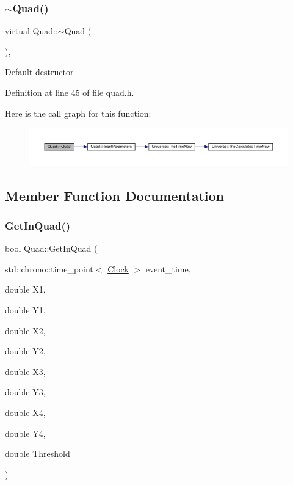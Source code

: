 \subsubsection{\texorpdfstring{$\sim$\+Quad()}{~Quad()}}
{\footnotesize\ttfamily virtual Quad\+::$\sim$\+Quad (\begin{DoxyParamCaption}{ }\end{DoxyParamCaption})\hspace{0.3cm}{\ttfamily [inline]}, {\ttfamily [virtual]}}

Default destructor 

Definition at line 45 of file quad.\+h.

Here is the call graph for this function\+:\nopagebreak
\begin{figure}[H]
\begin{center}
\leavevmode
\includegraphics[width=350pt]{class_quad_a64a53d5b7a7811c34a85054828f74866_cgraph}
\end{center}
\end{figure}


\subsection{Member Function Documentation}
\mbox{\label{class_quad_a80c2eb7c282e1566c5f7f235611b6206}} 
\subsubsection{\texorpdfstring{Get\+In\+Quad()}{GetInQuad()}}
{\footnotesize\ttfamily bool Quad\+::\+Get\+In\+Quad (\begin{DoxyParamCaption}\item[{std\+::chrono\+::time\+\_\+point$<$ \hyperlink{universe_8h_a0ef8d951d1ca5ab3cfaf7ab4c7a6fd80}{Clock} $>$}]{event\+\_\+time,  }\item[{double}]{X1,  }\item[{double}]{Y1,  }\item[{double}]{X2,  }\item[{double}]{Y2,  }\item[{double}]{X3,  }\item[{double}]{Y3,  }\item[{double}]{X4,  }\item[{double}]{Y4,  }\item[{double}]{Threshold }\end{DoxyParamCaption})\hspace{0.3cm}{\ttfamily [inline]}}



